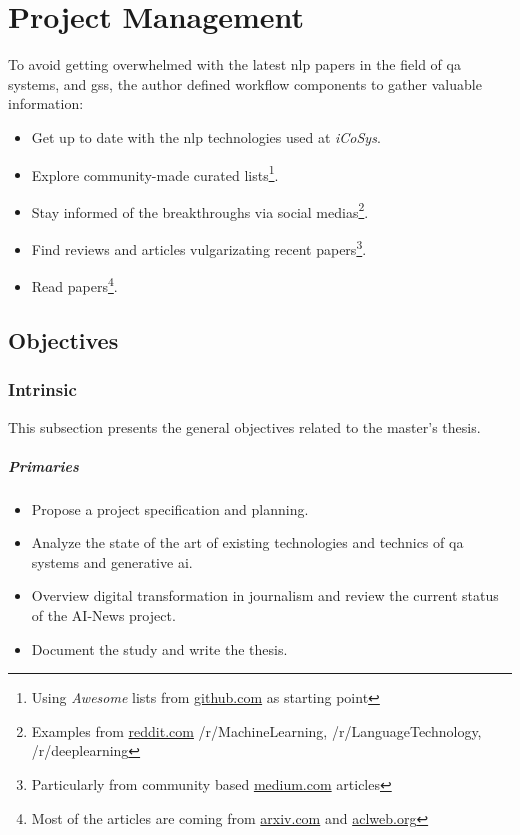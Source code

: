 \chapter{Project Management}
\label{chap:dev-project-management}

To avoid getting overwhelmed with the latest \gls{nlp} papers in the field of \gls{qa} systems, and \glspl{gs}, the author defined workflow components to gather valuable information:

\begin{itemize}
    \setlength\itemsep{0em}
    \item Get up to date with the \gls{nlp} technologies used at \textit{iCoSys}.
    \item Explore community-made curated lists\footnote{Using \textit{Awesome} lists from \url{github.com} as starting point}.
    \item Stay informed of the breakthroughs via social medias\footnote{Examples from \url{reddit.com} /r/MachineLearning, /r/LanguageTechnology, /r/deeplearning}.
    \item Find reviews and articles vulgarizating recent papers\footnote{Particularly from community based \url{medium.com} articles}.
    \item Read papers\footnote{Most of the articles are coming from \url{arxiv.com} and \url{aclweb.org}}.
\end{itemize}

\section{Objectives}
\subsection{Intrinsic}
This subsection presents the general objectives related to the master's thesis.
\paragraph{Primaries}
\begin{itemize}[noitemsep]
    \item Propose a project specification and planning.
    \item Analyze the state of the art of existing technologies and technics of \gls{qa} systems and \gls{generative} \gls{ai}.
    \item Overview digital transformation in journalism and review the current status of the AI-News project.
    \item Document the study and write the thesis.
\end{itemize}

